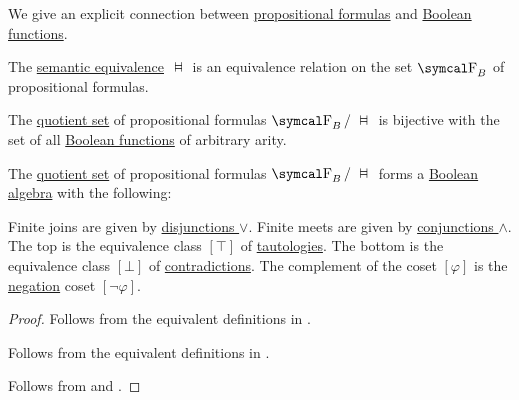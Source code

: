 \begin{theorem}\label{thm:propositional_formula_cosets_are_boolean_functions}
  We give an explicit connection between \hyperref[def:propositional_language/formula]{propositional formulas} and \hyperref[def:boolean_function]{Boolean functions}.

  \begin{ThmEnum}
     The \hyperref[def:propositional_semantics/equivalence]{semantic equivalence} \( \Sequiv \) is an equivalence relation on the set \( \CF_B \) of propositional formulas.

     The \hyperref[def:equivalence_relation]{quotient set} of propositional formulas \( \CF_B / \Sequiv \) is bijective with the set of all \hyperref[def:boolean_function]{Boolean functions} of arbitrary arity.

     The \hyperref[def:binary_relation/quotient]{quotient set} of propositional formulas \( \CF_B / \Sequiv \) forms a \hyperref[def:boolean_algebra]{Boolean algebra} with the following:
    \begin{RefList}
       Finite joins are given by \hyperref[def:propositional_alphabet/connectives/disjunction]{disjunctions \( \vee \)}.
       Finite meets are given by \hyperref[def:propositional_alphabet/connectives/conjunction]{conjunctions \( \wedge \)}.
       The top is the equivalence class \( [\top] \) of \hyperref[def:propositional_semantics/tautology]{tautologies}.
       The bottom is the equivalence class \( [\bot] \) of \hyperref[def:propositional_semantics/contradiction]{contradictions}.
       The complement of the coset \( [\varphi] \) is the \hyperref[def:propositional_alphabet/negation]{negation} coset \( [\neg \varphi] \).
    \end{RefList}
  \end{ThmEnum}
\end{theorem}
\begin{proof}
   Follows from the equivalent definitions in .

   Follows from the equivalent definitions in .

   Follows from  and .
\end{proof}

